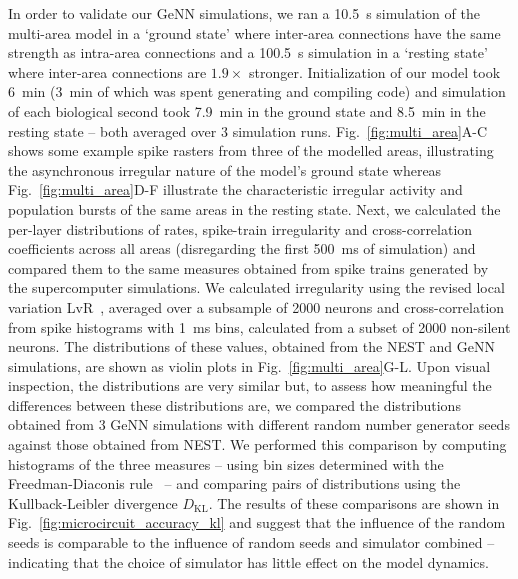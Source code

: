 \documentclass[9pt,a4paper]{amsart}
\begin{document}
In order to validate our GeNN simulations, we ran a \SI{10.5}{\second} simulation of the multi-area model in a `ground state' where inter-area connections have the same strength as intra-area connections and a \SI{100.5}{\second} simulation in a `resting state' where inter-area connections are $1.9\times$ stronger.
Initialization of our model took \SI{6}{\minute} (\SI{3}{\minute} of which was spent generating and compiling code) and simulation of each biological second took \SI{7.9}{\minute} in the ground state and \SI{8.5}{\minute} in the resting state -- both averaged over 3 simulation runs.
Fig.~\ref{fig:multi_area}A-C shows some example spike rasters from three of the modelled areas, illustrating the asynchronous irregular nature of the model's ground state whereas Fig.~\ref{fig:multi_area}D-F illustrate the characteristic irregular activity and population bursts of the same areas in the resting state.
Next, we calculated the per-layer distributions of rates, spike-train irregularity and cross-correlation coefficients across all areas (disregarding the first \SI{500}{\milli\second} of simulation) and compared them to the same measures obtained from spike trains generated by the supercomputer simulations.
We calculated irregularity using the revised local variation LvR~\citep{Shinomoto2009}, averaged over a subsample of \num{2000} neurons and cross-correlation from spike histograms with \SI{1}{\milli\second} bins, calculated from a subset of \num{2000} non-silent neurons.
The distributions of these values, obtained from the NEST and GeNN simulations, are shown as violin plots in Fig.~\ref{fig:multi_area}G-L.
Upon visual inspection, the distributions are very similar but, to assess how meaningful the differences between these distributions are, we compared the distributions obtained from 3 GeNN simulations with different random number generator seeds against those obtained from NEST.
We performed this comparison by computing histograms of the three measures -- using bin sizes determined with the Freedman-Diaconis rule~\citep{Freedman1981} -- and comparing pairs of distributions using the Kullback-Leibler divergence $D_\text{KL}$.
The results of these comparisons are shown in Fig.~\ref{fig:microcircuit_accuracy_kl} and suggest that the influence of the random seeds is comparable to the influence of random seeds and simulator combined -- indicating that the choice of simulator has little effect on the model dynamics.
%
\end{document}
